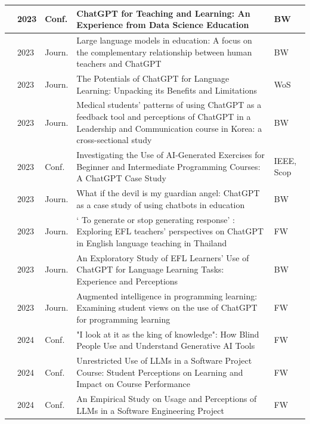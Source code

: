 {\begin{longtable}{|p{}|p{}|p{}|p{}|p{}|}
    \endhead
    \cite{Zheng.10112023}&2023&Conf.&ChatGPT for Teaching and Learning: An Experience from Data Science Education&BW\\ \hline
    \hline
    \cite{Jeon.2023}&2023&Journ.&Large language models in education: A focus on the complementary relationship between human teachers and ChatGPT&BW\\ 
    \hline
    \cite{Nugroho.2023}&2023&Journ.&The Potentials of ChatGPT for Language Learning: Unpacking its Benefits and Limitations&WoS\\ 
    \hline
    \cite{Park.2023}&2023&Journ.&Medical students' patterns of using ChatGPT as a feedback tool and perceptions of ChatGPT in a Leadership and Communication course in Korea: a cross-sectional study&BW\\ 
    \hline
    \cite{Speth.2023}&2023&Conf.&Investigating the Use of AI-Generated Exercises for Beginner and Intermediate Programming Courses: A ChatGPT Case Study&IEEE, Scop\\
    \hline
    \cite{Tlili.2023}&2023&Journ.&What if the devil is my guardian angel: ChatGPT as a case study of using chatbots in education&BW\\
    \hline
    \cite{Ulla.2023}&2023&Journ.&‘ To generate or stop generating response’ : Exploring EFL teachers’ perspectives on ChatGPT in English language teaching in Thailand&FW\\ 
    \hline
    \cite{Xiao.2023}&2023&Journ.&An Exploratory Study of EFL Learners’ Use of ChatGPT for Language Learning Tasks: Experience and Perceptions&BW\\
    \hline
    \cite{Yilmaz.2023}&2023&Journ.&Augmented intelligence in programming learning: Examining student views on the use of ChatGPT for programming learning&FW\\ 
    \hline
    \cite{Adnin.10272024}&2024&Conf.&"I look at it as the king of knowledge": How Blind People Use and Understand Generative AI Tools&FW\\
    \hline
    \cite{Korpimies.11122024}&2024&Conf.&Unrestricted Use of LLMs in a Software Project Course: Student Perceptions on Learning and Impact on Course Performance&FW\\ 
    \hline
    \cite{Rasnayaka.04202024}&2024&Conf.&An Empirical Study on Usage and Perceptions of LLMs in a Software Engineering Project&FW\\ 

\end{longtable}}
